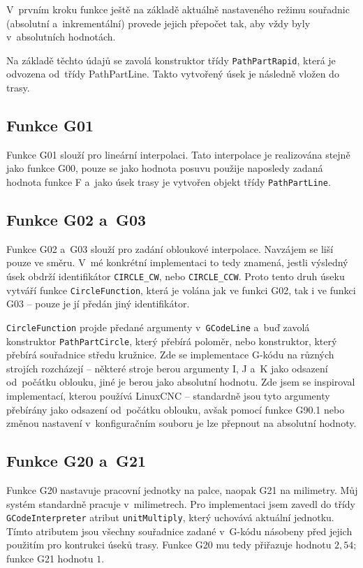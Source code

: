			V~prvním kroku funkce ještě na základě aktuálně nastaveného režimu souřadnic (absolutní a~inkrementální) provede jejich přepočet tak, aby vždy byly v~absolutních hodnotách.
			
			Na základě těchto údajů se zavolá konstruktor třídy {\tt PathPartRapid}, která je odvozena od~třídy PathPartLine. Takto vytvořený úsek je následně vložen do trasy.
			
			\subsection{Funkce G01}
			Funkce G01 slouží pro lineární interpolaci. Tato interpolace je realizována stejně jako funkce G00, pouze se jako hodnota posuvu použije naposledy zadaná hodnota funkce F a~jako úsek trasy je vytvořen objekt třídy {\tt PathPartLine}.
			
			\subsection{Funkce G02 a~G03}
			Funkce G02 a~G03 slouží pro zadání obloukové interpolace. Navzájem se liší pouze ve směru. V~mé konkrétní implementaci to tedy znamená, jestli výsledný úsek obdrží identifikátor {\tt CIRCLE\_CW}, nebo {\tt CIRCLE\_CCW}. Proto tento druh úseku vytváří funkce {\tt CircleFunction}, která je volána jak ve funkci G02, tak i ve funkci G03 -- pouze je jí předán jiný identifikátor.
			
			{\tt CircleFunction} projde předané argumenty v~{\tt GCodeLine} a~buď zavolá konstruktor {\tt PathPartCircle}, který přebírá poloměr, nebo konstruktor, který přebírá souřadnice středu kružnice. Zde se implementace G-kódu na různých strojích rozcházejí -- některé stroje berou argumenty I, J a~K jako odsazení od~počátku oblouku, jiné je berou jako absolutní hodnotu. Zde jsem se inspiroval implementací, kterou používá LinuxCNC -- standardně jsou tyto argumenty přebírány jako odsazení od~počátku oblouku, avšak pomocí funkce G90.1 nebo změnou nastavení v~konfiguračním souboru je lze přepnout na absolutní hodnoty.
			
			\subsection{Funkce G20 a~G21}
			
			Funkce G20 nastavuje pracovní jednotky na palce, naopak G21 na milimetry. Můj systém standardně pracuje v~milimetrech. Pro implementaci jsem zavedl do třídy {\tt GCodeInterpreter} atribut {\tt unitMultiply}, který uchovává aktuální jednotku. Tímto atributem jsou všechny souřadnice zadané v~G-kódu násobeny před jejich použitím pro kontrukci úseků trasy. Funkce G20 mu tedy přiřazuje hodnotu $2,54$; funkce G21 hodnotu $1$.
			
